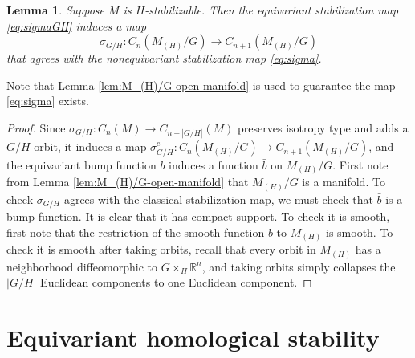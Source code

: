 \documentclass[11pt]{amsart}
\newtheorem{lemma}[equation]{Lemma}
\theoremstyle{definition}
\numberwithin{equation}{subsection} %
\def\r{\mathbb{R}}
\newcommand{\x}{\times}
\begin{document}


\begin{lemma}\label{Lem:sigma-comparison}
Suppose $M$ is $H$-stabilizable.
Then the equivariant stabilization map \eqref{eq:sigmaGH} induces a map
$$ \bar{\sigma}_{G/H}: C_n(M_{(H)}/G)\to C_{n+1}(M_{(H)}/G) $$
that agrees with the nonequivariant stabilization map \eqref{eq:sigma}. 
\end{lemma}
Note that Lemma \ref{lem:M_(H)/G-open-manifold} is used to guarantee the map
\eqref{eq:sigma} exists.
\begin{proof}
Since $\sigma_{G/H}:C_n(M)\to C_{n+|G/H|}(M)$ preserves isotropy type and adds a $G/H$ orbit, it induces a map $\bar{\sigma}_{G/H}^e:C_n(M_{(H)}/G)\to C_{n+1}(M_{(H)}/G)$, and the equivariant bump function $b$ induces a function $\bar{b}$ on $M_{(H)}/G$. First note from Lemma \ref{lem:M_(H)/G-open-manifold} that $M_{(H)}/G$ is a manifold.
To check $\bar{\sigma}_{G/H}$ agrees with the classical stabilization map, we must check that $\bar{b}$ is a bump function. 
It is clear that it has compact support. To check it is smooth, first note that the restriction of the smooth function $b$ to $M_{(H)}$ is smooth. To check it is smooth after taking orbits, recall that every orbit in $M_{(H)}$ has a neighborhood diffeomorphic to $G\x_H \r^n$, and taking orbits simply collapses the $|G/H|$ Euclidean components to one Euclidean component.
\end{proof}




\section{Equivariant homological stability}\label{Sec:Stab}
\end{document}
